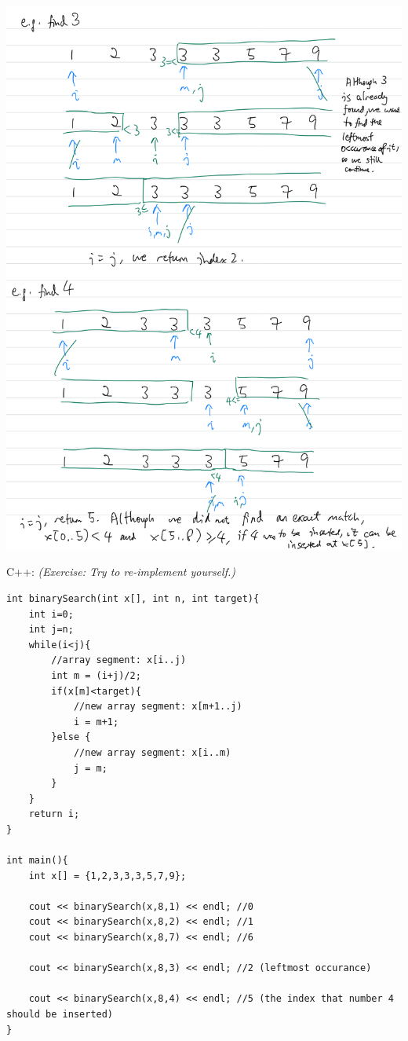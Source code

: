 \includegraphics[width=14cm]{images/ch7-binarysearch34.png}

\pagebreak

C++: \textit{(Exercise:  Try to re-implement yourself.)}

\begin{lstlisting}
int binarySearch(int x[], int n, int target){
    int i=0;
    int j=n;
    while(i<j){
        //array segment: x[i..j)
        int m = (i+j)/2;
        if(x[m]<target){
            //new array segment: x[m+1..j)
            i = m+1;
        }else {
            //new array segment: x[i..m)
            j = m;
        }
    }
    return i;
}

int main(){
    int x[] = {1,2,3,3,3,5,7,9};

    cout << binarySearch(x,8,1) << endl; //0 
    cout << binarySearch(x,8,2) << endl; //1
    cout << binarySearch(x,8,7) << endl; //6

    cout << binarySearch(x,8,3) << endl; //2 (leftmost occurance)

    cout << binarySearch(x,8,4) << endl; //5 (the index that number 4 should be inserted)
}
\end{lstlisting}

